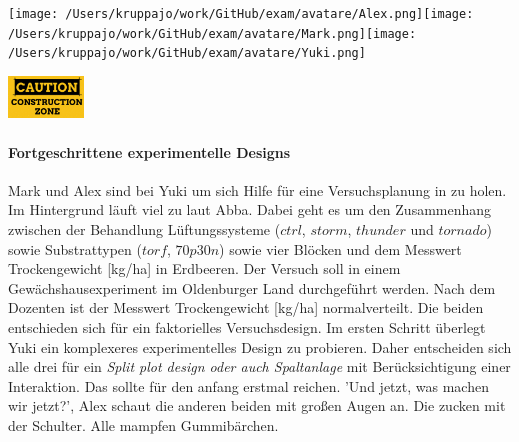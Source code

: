 \documentclass[a4paper, 9pt]{scrartcl}\usepackage[]{graphicx}\usepackage[]{xcolor}
\begin{document}
 
\ifcollection
\begin{flushright}
\tiny\vspace{-3Ex}
\textbf{\examinhaltstart}
\exammodulebiostat
\vspace{-4Ex}
\end{flushright}
\begin{minipage}[t]{0.5\textwidth}
\texttt{[image: /Users/kruppajo/work/GitHub/exam/avatare/Alex.png]}\hspace{-4mm}\texttt{[image: /Users/kruppajo/work/GitHub/exam/avatare/Mark.png]}\hspace{-4mm}\texttt{[image: /Users/kruppajo/work/GitHub/exam/avatare/Yuki.png]}
\end{minipage}
\begin{minipage}[t]{0.5\textwidth}
\hfill
\href{https://youtu.be/wJqsNV1hOW8}{\includegraphics[width = 2cm]{img/caution}}
\end{minipage}
\fi



\ifcollection
\paragraph{Fortgeschrittene experimentelle Designs}
\fi

Mark und Alex sind bei Yuki um sich Hilfe für eine Versuchsplanung in \Rlogo zu holen. Im Hintergrund läuft viel zu laut Abba. Dabei geht es um den Zusammenhang zwischen der Behandlung Lüftungssysteme ($ctrl$, $storm$, $thunder$ und $tornado$) sowie Substrattypen ($torf$, $70p30n$) sowie vier Blöcken und dem Messwert Trockengewicht [kg/ha] in Erdbeeren. Der Versuch soll in einem Gewächshausexperiment im Oldenburger Land durchgeführt werden. Nach dem Dozenten ist der Messwert Trockengewicht [kg/ha] normalverteilt. Die beiden entschieden sich für ein faktorielles Versuchsdesign. Im ersten Schritt überlegt Yuki ein komplexeres experimentelles Design zu probieren. Daher entscheiden sich alle drei für ein \textit{Split plot design oder auch Spaltanlage} mit Berücksichtigung einer Interaktion. Das sollte für den anfang erstmal reichen. 'Und jetzt, was machen wir jetzt?', Alex schaut die anderen beiden mit großen Augen an. Die zucken mit der Schulter. Alle mampfen Gummibärchen.\\
\end{document}
